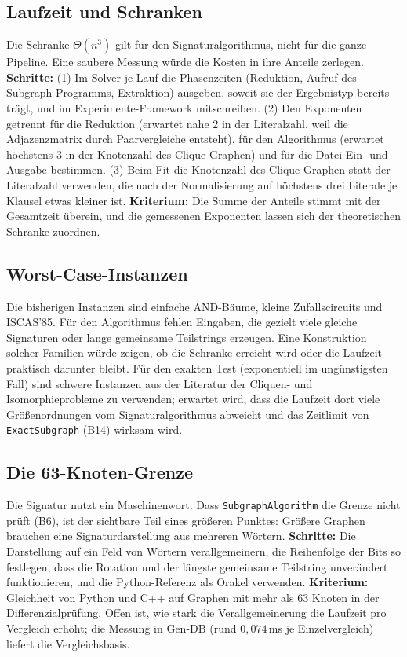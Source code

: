 \subsection{Laufzeit und Schranken}

Die Schranke $\Theta(n^3)$ gilt für den Signaturalgorithmus, nicht für die ganze Pipeline. Eine saubere Messung würde die Kosten in ihre Anteile zerlegen. \textbf{Schritte:} (1) Im Solver je Lauf die Phasenzeiten (Reduktion, Aufruf des Subgraph-Programms, Extraktion) ausgeben, soweit sie der Ergebnistyp bereits trägt, und im Experimente-Framework mitschreiben. (2) Den Exponenten getrennt für die Reduktion (erwartet nahe $2$ in der Literalzahl, weil die Adjazenzmatrix durch Paarvergleiche entsteht), für den Algorithmus (erwartet höchstens $3$ in der Knotenzahl des Clique-Graphen) und für die Datei-Ein- und Ausgabe bestimmen. (3) Beim Fit die Knotenzahl des Clique-Graphen statt der Literalzahl verwenden, die nach der Normalisierung auf höchstens drei Literale je Klausel etwas kleiner ist. \textbf{Kriterium:} Die Summe der Anteile stimmt mit der Gesamtzeit überein, und die gemessenen Exponenten lassen sich der theoretischen Schranke zuordnen.

\subsection{Worst-Case-Instanzen}

Die bisherigen Instanzen sind einfache AND-Bäume, kleine Zufallscircuits und ISCAS'85. Für den Algorithmus fehlen Eingaben, die gezielt viele gleiche Signaturen oder lange gemeinsame Teilstrings erzeugen. Eine Konstruktion solcher Familien würde zeigen, ob die Schranke erreicht wird oder die Laufzeit praktisch darunter bleibt. Für den exakten Test (exponentiell im ungünstigsten Fall) sind schwere Instanzen aus der Literatur der Cliquen- und Isomorphieprobleme zu verwenden; erwartet wird, dass die Laufzeit dort viele Größenordnungen vom Signaturalgorithmus abweicht und das Zeitlimit von \texttt{ExactSubgraph} (B14) wirksam wird.

\subsection{Die 63-Knoten-Grenze}

Die Signatur nutzt ein Maschinenwort. Dass \texttt{SubgraphAlgorithm} die Grenze nicht prüft (B6), ist der sichtbare Teil eines größeren Punktes: Größere Graphen brauchen eine Signaturdarstellung aus mehreren Wörtern. \textbf{Schritte:} Die Darstellung auf ein Feld von Wörtern verallgemeinern, die Reihenfolge der Bits so festlegen, dass die Rotation und der längste gemeinsame Teilstring unverändert funktionieren, und die Python-Referenz als Orakel verwenden. \textbf{Kriterium:} Gleichheit von Python und C++ auf Graphen mit mehr als $63$ Knoten in der Differenzialprüfung. Offen ist, wie stark die Verallgemeinerung die Laufzeit pro Vergleich erhöht; die Messung in Gen-DB (rund $0{,}074$\,ms je Einzelvergleich) liefert die Vergleichsbasis.

